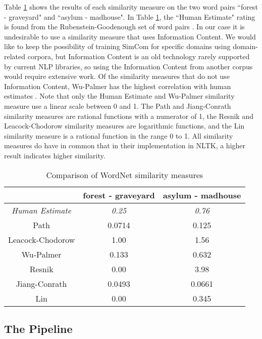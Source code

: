 \documentclass{article}
\begin{document}
Table \ref{table:wordnetsimilarity} shows the results of each similarity measure on the two word pairs ``forest - graveyard" and ``asylum - madhouse". In Table \ref{table:wordnetsimilarity}, the ``Human Estimate" rating is found from the Rubenstein-Goodenough set of word pairs \cite{rubenstein1965contextual}. In our case it is undesirable to use a similarity measure that uses Information Content. We would like to keep the possibility of training SimCom for specific domains using domain-related corpora, but Information Content is an old technology rarely supported by current NLP libraries, so using the Information Content from another corpus would require extensive work. Of the similarity measures that do not use Information Content, Wu-Palmer has the highest correlation with human estimates \citep{budanitsky2006evaluating,seco2004intrinsic,mihalcea2006corpus}. %
Note that only the Human Estimate and Wu-Palmer similarity measure use a linear scale between 0 and 1. The Path and Jiang-Conrath similarity measures are rational functions with a numerator of 1, the Resnik and Leacock-Chodorow similarity measures are logarithmic functions, and the Lin similarity measure is a rational function in the range 0 to 1. All similarity measures do have in common that in their implementation in NLTK, a higher result indicates higher similarity.

\begin{table}[h!]
\caption{Comparison of WordNet similarity measures} %
\centering
\begin{tabular}{|c||c|c|}
	\hline
	& forest - graveyard & asylum - madhouse \\
	\hline
	\textit{Human Estimate} & \textit{0.25} & \textit{0.76} \\
	Path & 0.0714 & 0.125 \\
	Leacock-Chodorow & 1.00 & 1.56 \\
	Wu-Palmer & 0.133 & 0.632 \\
	Resnik & 0.00 & 3.98 \\
	Jiang-Conrath & 0.0493 & 0.0661 \\
	Lin & 0.00 & 0.345 \\
	\hline
\end{tabular}
\label{table:wordnetsimilarity}
\end{table}

\subsection{The Pipeline}
\end{document}
